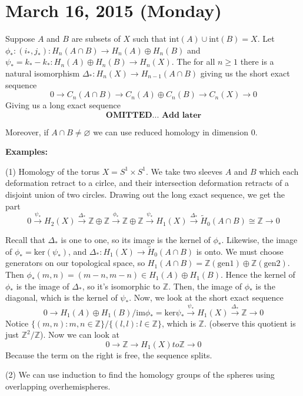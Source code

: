 \documentclass{article}
\begin{document}
\section{March 16, 2015 (Monday)} Suppose $A$ and $B$ are subsets of $X$ such that $\text{int}(A) \cup \text{int}(B) = X$. Let $\phi_*:(i_*, j_*): H_n(A\cap B) \to H_n(A) \oplus H_n(B)$ and $\psi_* = k_* - k_*:H_n(A) \oplus H_n(B) \to H_n(X)$. The for all $n \geq 1$ there is a natural isomorphism $\Delta_*:H_n(X) \to H_{n-1}(A \cap B)$ giving us the short exact sequence
\[
0 \to C_n(A \cap B) \to C_n(A) \oplus C_n(B) \to C_n(X) \to 0
\]
Giving us a long exact sequence
\[
\textbf{OMITTED... Add later}
\]

Moreover, if $A \cap B \neq \varnothing$ we can use reduced homology in dimension $0$.

\textbf{Examples:}

(1) Homology of the torus $X = S^1 \times S^1$. We take two sleeves $A$ and $B$ which each deformation retract to a cirlce, and their intersection deformation retracts of a disjoint union of two circles. Drawing out the long exact sequence, we get the part
\[
0 \xrightarrow{\psi_*} H_2(X) \xrightarrow{\Delta_*} \mathbb{Z} \oplus \mathbb{Z} \xrightarrow{\phi_*} \mathbb{Z} \oplus \mathbb{Z} \xrightarrow{\psi_*} H_1(X) \xrightarrow{\Delta_*} \tilde{H}_0(A \cap B) \cong \mathbb{Z} \to 0
\]

Recall that $\Delta_*$ is one to one, so its image is the kernel of $\phi_*$. Likewise, the image of $\phi_* = \text{ker}(\psi_*)$, and $\Delta_*:H_1(X) \to \tilde{H}_0(A \cap B)$ is onto. We must choose generators on our topological space, so $H_1(A \cap B) = \mathbb{Z}(\text{gen1})\oplus\mathbb{Z}(\text{gen2})$. Then $\phi_*(m,n) = (m-n, m-n) \in H_1(A) \oplus H_1(B)$. Hence the kernel of $\phi_*$ is the image of $\Delta_*$, so it's isomorphic to $\mathbb{Z}$. Then, the image of $\phi_*$ is the diagonal, which is the kernel of $\psi_*$. Now, we look at the short exact sequence
\[
0 \to H_1(A) \oplus H_1(B) / \text{im}\phi_* = \text{ker}\psi_* \xrightarrow{\psi_*} H_1(X) \xrightarrow{\Delta_*} \mathbb{Z} \to 0
\]
Notice $\{ (m,n) : m,n \in \mathbb{Z} \}/\{ (l,l): l \in \mathbb{Z} \}$, which is $\mathbb{Z}$. (observe this quotient is just $\mathbb{Z}^2/\mathbb{Z}$). Now we can look at 
\[
0 \to \mathbb{Z} \to H_1(X) to \mathbb{Z} \to 0
\]
Because the term on the right is free, the sequence splits.

(2) We can use induction to find the homology groups of the spheres using overlapping overhemispheres.
\end{document}
